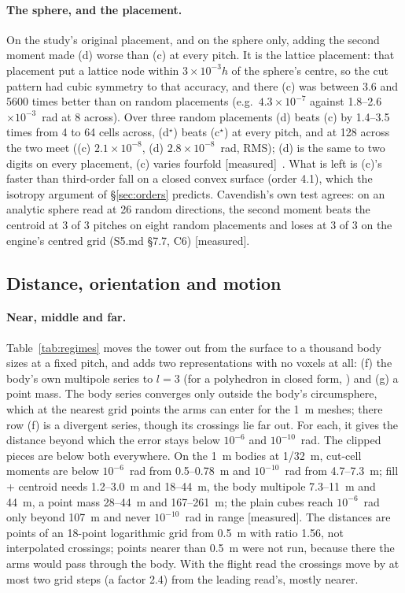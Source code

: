 \documentclass[10pt,a4paper]{article}
\newcommand{\tagM}{\textsf{\small[measured]}}
\newcommand{\cutcell}{cut-cell moments}
\begin{document}
\paragraph{The sphere, and the placement.} On the study's original placement, and on the sphere
only, adding the second moment made (d) worse than (c) at every pitch. It is the lattice placement:
that placement put a lattice node within $3\times10^{-3}h$ of the sphere's centre, so the cut pattern had cubic symmetry to that accuracy, and there (c) was between 3.6 and 5600
times better than on random placements (e.g.\ $4.3\times10^{-7}$ against 1.8--2.6$\times10^{-3}$~rad
at 8 across). Over three random placements (d) beats (c) by 1.4--3.5 times from 4 to 64 cells across,
(d$^\star$) beats (c$^\star$) at every pitch, and at 128 across the two meet ((c)
$2.1\times10^{-8}$, (d) $2.8\times10^{-8}$~rad, RMS); (d) is the same to two digits on every
placement, (c) varies fourfold \tagM\ \citep[Q3]{paperrealread}. What is left is (c)'s faster than
third-order fall on a closed convex surface (order 4.1), which the isotropy argument of
\S\ref{sec:orders} predicts. Cavendish's own test agrees: on an analytic sphere read at 26 random
directions, the second moment beats the centroid at 3 of 3 pitches on eight random placements and
loses at 3 of 3 on the engine's centred grid (S5.md \S7.7, C6) \tagM.

\subsection{Distance, orientation and motion}\label{sec:motion}

\paragraph{Near, middle and far.} Table~\ref{tab:regimes} moves the tower out from the surface to a
thousand body sizes at a fixed pitch, and adds two representations with no voxels at all: (f) the
body's own multipole series to $l = 3$ (for a polyhedron in closed form, \citealp{werner1997sh}) and
(g) a point mass. The body series converges only outside the body's circumsphere, which at the
nearest grid points the arms can enter for the 1~m meshes; there row (f) is a divergent series, though its
crossings lie far out. For each, it gives the distance beyond
which the error stays below $10^{-6}$ and $10^{-10}$~rad. The clipped pieces are below both
everywhere. On the 1~m bodies at 1/32~m, \cutcell{} are below $10^{-6}$~rad from 0.5--0.78~m and
$10^{-10}$~rad from 4.7--7.3~m; fill + centroid needs 1.2--3.0~m and 18--44~m, the body multipole
7.3--11~m and 44~m, a point mass 28--44~m and 167--261~m; the plain cubes reach $10^{-6}$~rad only
beyond 107~m and never $10^{-10}$~rad in range \tagM. The distances are points of an 18-point
logarithmic grid from 0.5~m with ratio 1.56, not interpolated crossings; points nearer than 0.5~m
were not run, because there the arms would pass through the body. With the flight read the crossings
move by at most two grid steps (a factor 2.4) from the leading read's, mostly nearer.
\end{document}
